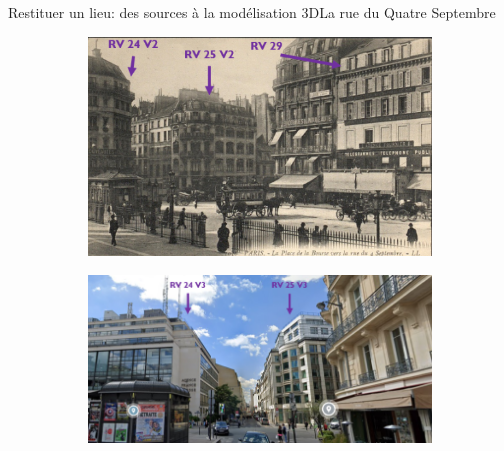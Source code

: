\documentclass[8pt]{beamer}
\begin{document}
\begin{frame}{Restituer un lieu: des sources à la modélisation 3D}{La rue du Quatre Septembre}
\begin{figure}
		\begin{subfigure}{0.48\textwidth}
			\includegraphics[width=\textwidth]{includes/c_slide7_2.png}
		\end{subfigure}
		\begin{subfigure}{0.48\textwidth}
			\includegraphics[width=\textwidth]{includes/c_slide7_3.png}
		\end{subfigure}
	\end{figure}
\end{frame}
\end{document}
